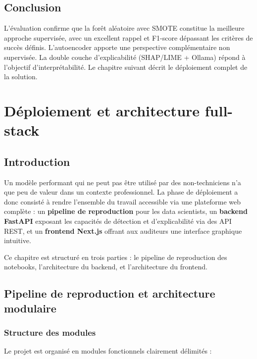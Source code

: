 \documentclass[12pt,a4paper,twoside]{report}
\begin{document}
\section*{Conclusion}

L'évaluation confirme que la forêt aléatoire avec SMOTE constitue la meilleure approche supervisée, avec un excellent rappel et F1-score dépassant les critères de succès définis. L'autoencoder apporte une perspective complémentaire non supervisée. La double couche d'explicabilité (SHAP/LIME + Ollama) répond à l'objectif d'interprétabilité. Le chapitre suivant décrit le déploiement complet de la solution.

\chapter{Déploiement et architecture full-stack}

\section{Introduction}

Un modèle performant qui ne peut pas être utilisé par des non-techniciens n'a que peu de valeur dans un contexte professionnel. La phase de déploiement a donc consisté à rendre l'ensemble du travail accessible via une plateforme web complète : un \textbf{pipeline de reproduction} pour les data scientists, un \textbf{backend FastAPI} exposant les capacités de détection et d'explicabilité via des API REST, et un \textbf{frontend Next.js} offrant aux auditeurs une interface graphique intuitive.

Ce chapitre est structuré en trois parties : le pipeline de reproduction des notebooks, l'architecture du backend, et l'architecture du frontend.

\section{Pipeline de reproduction et architecture modulaire}

\subsection{Structure des modules}

Le projet est organisé en modules fonctionnels clairement délimités :
\end{document}
